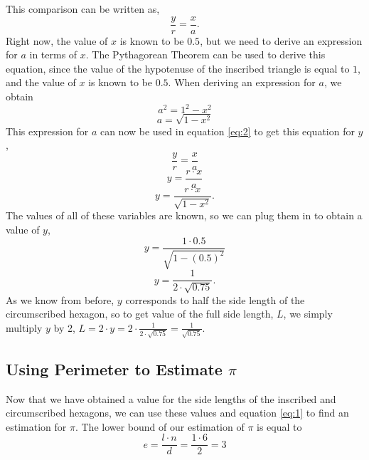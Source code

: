 \documentclass{article}
\begin{document}
This comparison can be written as,
\begin{equation} \label{eq:2}
    \frac{y}{r}=\frac{x}{a}.
\end{equation}
Right now, the value of $x$ is known to be $0.5$, but we need to derive an expression for $a$ in terms of $x$. The Pythagorean Theorem can be used to derive this equation, since the value of the hypotenuse of the inscribed triangle is equal to $1$, and the value of $x$ is known to be $0.5$. When deriving an expression for $a$, we obtain
\begin{equation*}
    a^2 = 1^2 - x^2
\end{equation*}
\begin{equation*}
    a = \sqrt{1-x^2}
\end{equation*}
This expression for $a$ can now be used in equation \ref{eq:2} to get this equation for $y$,
\begin{equation*}
    \frac{y}{r}=\frac{x}{a}
\end{equation*}
\begin{equation*}
    y=\frac{r \cdot x}{a}
\end{equation*}
\begin{equation*}
    y = \frac{r \cdot x}{\sqrt{1-x^2}}.
\end{equation*}
The values of all of these variables are known, so we can plug them in to obtain a value of $y$,
\begin{equation*}
    y = \frac{1 \cdot 0.5}{\sqrt{1-(0.5)^2}}
\end{equation*}
\begin{equation*}
    y=\frac{1}{2 \cdot \sqrt{0.75}}.
\end{equation*}
As we know from before, $y$ corresponds to half the side length of the circumscribed hexagon, so to get value of the full side length, $L$, we simply multiply $y$ by 2, $L = 2 \cdot y = 2 \cdot \frac{1}{2 \cdot \sqrt{0.75}} = \frac{1}{\sqrt{0.75}}$.


\subsection{Using Perimeter to Estimate $\pi$}
Now that we have obtained a value for the side lengths of the inscribed and circumscribed hexagons, we can use these values and equation \ref{eq:1} to find an estimation for $\pi$. The lower bound of our estimation of $\pi$ is equal to 
\begin{equation*}
    e = \frac{l \cdot n}{d} = \frac{1 \cdot 6}{2} = 3
\end{equation*}
\end{document}
